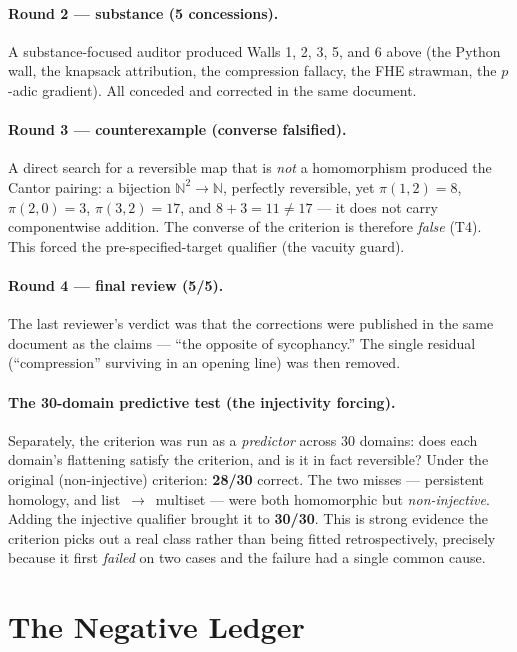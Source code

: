 \documentclass[11pt,a4paper]{article}
\newcommand{\Tf}{\textsf{T4}}
\theoremstyle{definition}
\theoremstyle{plain}
\begin{document}
\paragraph{Round 2 --- substance (5 concessions).}
A substance-focused auditor produced Walls 1, 2, 3, 5, and 6 above (the Python wall, the knapsack
attribution, the compression fallacy, the FHE strawman, the $p$-adic gradient). All conceded and
corrected in the same document.

\paragraph{Round 3 --- counterexample (converse falsified).}
A direct search for a reversible map that is \emph{not} a homomorphism produced the Cantor pairing:
a bijection $\mathbb{N}^2\to\mathbb{N}$, perfectly reversible, yet $\pi(1,2)=8$, $\pi(2,0)=3$,
$\pi(3,2)=17$, and $8+3=11\ne 17$ --- it does not carry componentwise addition. The converse of the
criterion is therefore \emph{false} (\Tf). This forced the pre-specified-target qualifier (the
vacuity guard).

\paragraph{Round 4 --- final review (5/5).}
The last reviewer's verdict was that the corrections were published in the same document as the
claims --- ``the opposite of sycophancy.'' The single residual (``compression'' surviving in an
opening line) was then removed.

\paragraph{The 30-domain predictive test (the injectivity forcing).}
Separately, the criterion was run as a \emph{predictor} across 30 domains: does each domain's
flattening satisfy the criterion, and is it in fact reversible? Under the original (non-injective)
criterion: \textbf{28/30} correct. The two misses --- persistent homology, and list~$\to$~multiset
--- were both homomorphic but \emph{non-injective}. Adding the injective qualifier brought it to
\textbf{30/30}. This is strong evidence the criterion picks out a real class rather than being
fitted retrospectively, precisely because it first \emph{failed} on two cases and the failure had
a single common cause.

\section{The Negative Ledger}\label{sec:negative}
\end{document}
